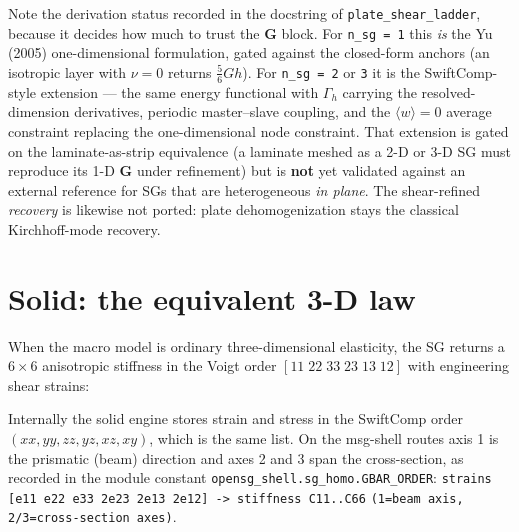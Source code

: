 Note the derivation status recorded in the docstring of
\texttt{plate\_shear\_ladder}, because it decides how much to trust the
$\mathbf G$ block. For \texttt{n\_sg = 1} this \emph{is} the Yu (2005)
one-dimensional formulation, gated against the closed-form anchors (an
isotropic layer with $\nu = 0$ returns $\tfrac{5}{6}Gh$). For \texttt{n\_sg = 2}
or \texttt{3} it is the SwiftComp-style extension --- the same energy functional
with $\Gamma_h$ carrying the resolved-dimension derivatives, periodic
master--slave coupling, and the $\langle w \rangle = 0$ average constraint
replacing the one-dimensional node constraint. That extension is gated on the
laminate-as-strip equivalence (a laminate meshed as a 2-D or 3-D SG must
reproduce its 1-D $\mathbf G$ under refinement) but is \textbf{not} yet
validated against an external reference for SGs that are heterogeneous
\emph{in plane}. The shear-refined \emph{recovery} is likewise not ported:
plate dehomogenization stays the classical Kirchhoff-mode recovery.

\section{Solid: the equivalent 3-D law}
\label{sec:solid}

When the macro model is ordinary three-dimensional elasticity, the SG returns a
$6\times6$ anisotropic stiffness in the Voigt order $[11\;22\;33\;23\;13\;12]$
with engineering shear strains:


Internally the solid engine stores strain and stress in the SwiftComp order
$(xx, yy, zz, yz, xz, xy)$, which is the same list. On the msg-shell routes
axis 1 is the prismatic (beam) direction and axes 2 and 3 span the
cross-section, as recorded in the module constant
\texttt{opensg\_shell.sg\_homo.GBAR\_ORDER}:
\verb|strains [e11 e22 e33 2e23 2e13 2e12] -> stiffness C11..C66|
\verb|(1=beam axis, 2/3=cross-section axes)|.

